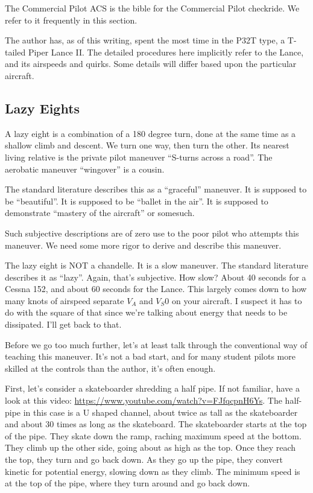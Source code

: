 The Commercial Pilot ACS \cite{acs-commercial} is the bible for the Commercial Pilot checkride. We refer to it frequently in this section.

The author has, as of this writing, spent the most time in the P32T type, a T-tailed Piper Lance II. The detailed procedures here implicitly refer to the Lance, and its airspeeds and quirks. Some details will differ based upon the particular aircraft.

\subsection{Lazy Eights}

A lazy eight is a combination of a 180 degree turn, done at the same time as a shallow climb and descent. We turn one way, then turn the other. Its nearest living relative is the private pilot maneuver ``S-turns across a road''. The aerobatic maneuver ``wingover'' is a cousin.

The standard literature describes this as a ``graceful'' maneuver. It is supposed to be ``beautiful''. It is supposed to be ``ballet in the air''. It is supposed to demonstrate ``mastery of the aircraft'' or somesuch.

Such subjective descriptions are of zero use to the poor pilot who attempts this maneuver. We need some more rigor to derive and describe this maneuver.

The lazy eight is NOT a chandelle. It is a slow maneuver. The standard literature describes it as ``lazy''. Again, that's subjective. How slow? About 40 seconds for a Cessna 152, and about 60 seconds for the Lance. This largely comes down to how many knots of airspeed separate $V_A$ and $V_S0$ on your aircraft. I suspect it has to do with the square of that since we're talking about energy that needs to be dissipated. I'll get back to that.

Before we go too much further, let's at least talk through the conventional way of teaching this maneuver. It's not a bad start, and for many student pilots more skilled at the controls than the author, it's often enough.

First, let's consider a skateboarder shredding a half pipe. If not familiar, have a look at this video: \url{https://www.youtube.com/watch?v=FJfqcpnH6Ys}. The half-pipe in this case is a U shaped channel, about twice as tall as the skateboarder and about 30 times as long as the skateboard. The skateboarder starts at the top of the pipe. They skate down the ramp, raching maximum speed at the bottom. They climb up the other side, going about as high as the top. Once they reach the top, they turn and go back down. As they go up the pipe, they convert kinetic for potential energy, slowing down as they climb. The minimum speed is at the top of the pipe, where they turn around and go back down.

